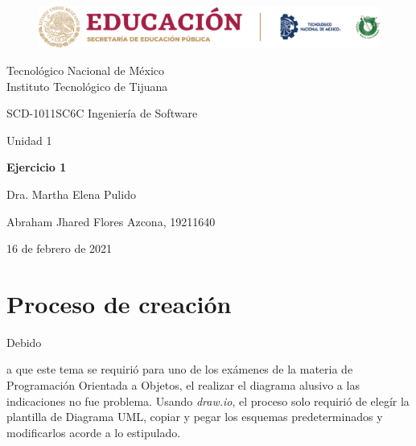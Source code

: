 \documentclass[stu, 12pt, letterpaper, donotrepeattitle, floatsintext, natbib]{apa7}
\begin{document}
    \begin{titlepage}
        \begin{figure}[ht]
            \centering
            \includegraphics[width=15cm]{logosITT.png}
        \end{figure}
        \centering
        {\Large Tecnológico Nacional de México\\Instituto Tecnológico de Tijuana\par}
        \vspace{1cm}
        {\Large SCD-1011SC6C Ingeniería de Software\par}
        \vspace{1cm}
        {\Large Unidad 1\par}
        \vspace{2cm}
        {\Large\bfseries Ejercicio 1\par}
        \vspace{2cm}
        {\large Dra. Martha Elena Pulido\par}
        \vfill
            {\large Abraham Jhared Flores Azcona, 19211640\par}
        \vfill
        {\large 16 de febrero de 2021}
    \end{titlepage}

\renewcommand\contentsname{Contenido}
\tableofcontents

\newpage
\section{Proceso de creación}
Debido \begin{justifying}
    a que este tema se requirió para uno de los exámenes de la materia de Programación Orientada a Objetos, el realizar el diagrama alusivo
    a las indicaciones no fue problema. Usando \emph{draw.io}, el proceso solo requirió de elegír la plantilla de Diagrama UML, copiar y pegar
    los esquemas predeterminados y modificarlos acorde a lo estipulado.\par
    \end{justifying}
\vspace{\baselineskip}
\end{document}
